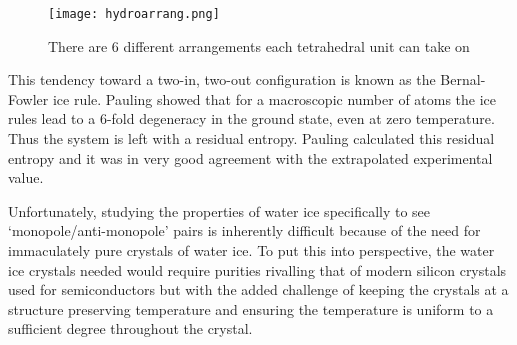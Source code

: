 \par
\begin{figure}[ht!]
    \begin{center}
        \texttt{[image: hydroarrang.png]}
        \caption[Tetrahedral unit configurations]{There are 6 different arrangements each tetrahedral unit can take on}
        \label{fig:gf3}
    \end{center}
\end{figure}
\par
This tendency toward a two-in, two-out configuration is known as the Bernal-Fowler ice rule.  Pauling showed that for a macroscopic number of atoms the ice rules lead to a 6-fold degeneracy in the ground state, even at zero temperature.  Thus the system is left with a residual entropy. Pauling calculated this residual entropy and it was in very good agreement with the extrapolated experimental value.
\par
Unfortunately, studying the properties of water ice specifically to see `monopole/anti-monopole' pairs is inherently difficult because of the need for immaculately pure crystals of water ice.  To put this into perspective, the water ice crystals needed would require purities rivalling that of modern silicon crystals used for semiconductors but with the added challenge of keeping the crystals at a structure preserving temperature and ensuring the temperature is uniform to a sufficient degree throughout the crystal.
\clearpage
